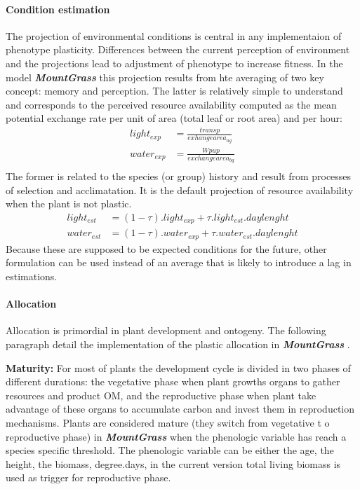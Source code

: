 \documentclass[a4paper,twoside, justified,marginals=raggedright, nobib]{tufte-handout}
\newcommand{\model}{\textit{\textbf{MountGrass }}}
\begin{document}
\paragraph{Condition estimation} The projection of environmental conditions is central in any implementaion of phenotype plasticity. Differences between the current perception of environment and the projections lead to adjustment of phenotype to increase fitness. In the model \model this projection results from hte averaging of two key concept: memory and perception. The latter is relatively simple to understand and corresponds to the perceived resource availability computed as the mean potential exchange rate per unit of area (total leaf or root area) and per hour:
\begin{align}
light_{exp} &= \frac{transp}{exhange area_{ag}}\\
water_{exp} &= \frac{Wpup}{exchange area_{bg}}\\
\end{align}
The former is related to the species (or group) history and result from processes of selection and acclimatation. It is the default projection of resource availability when the plant is not plastic. 
\begin{align}
light_{est} &= (1 - \tau).light_{exp} + \tau . light_{est} . daylenght\\
water_{est} &= (1 - \tau).water_{exp} + \tau . water_{est} . daylenght
\end{align}
\indent Because these are supposed to be expected conditions for the future, other formulation can be used instead of an average that is likely to introduce a lag in estimations.



\paragraph{Allocation} \label{par:allocation}
Allocation is primordial in plant development and ontogeny. The following paragraph detail the implementation of the plastic allocation in \model.

\textbf{Maturity:} For most of plants the development cycle is divided in two phases of different durations: the vegetative phase when plant growths organs to gather resources and product OM, and the reproductive phase when plant take advantage of these organs to accumulate carbon and invest them in reproduction mechanisms. Plants are considered mature (they switch from vegetative t o reproductive phase) in \model when the phenologic variable has reach a species specific threshold. The phenologic variable can be either the age, the height, the biomass, degree.days, in the current version total living biomass is used as trigger for reproductive phase.\\
\indent 
\end{document}
